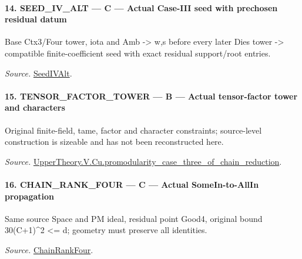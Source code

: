 \documentclass[11pt,a4paper]{article}
\numberwithin{equation}{section}
\theoremstyle{remark}\newtheorem{remark}[theorem]{Remark}
\begin{document}
\paragraph{14. SEED\_\allowbreak IV\_\allowbreak ALT — C — Actual Case-III seed with prechosen residual datum}

Base Ctx3/Four tower, iota and Amb -> w,s before every later Dies tower -> compatible finite-coefficient seed with exact residual support/root entries.

\emph{Source.} \href{https://github.com/CocoSgt/riemann-hypothesis-lean/blob/7cbf7a0c32fca1badf05931879a37c3f8a2b03b4/src/Development/AutomorphicArithmetic/AutomorphicVarieties/ModularityArgument/ThresholdArguments/DenseThresholdCases/PromodularityCaseThree.lean#L19-L25}{SeedIVAlt}.



\paragraph{15. TENSOR\_\allowbreak FACTOR\_\allowbreak TOWER — B — Actual tensor-factor tower and characters}

Original finite-field, tame, factor and character constraints; source-level construction is sizeable and has not been reconstructed here.

\emph{Source.} \href{https://github.com/CocoSgt/riemann-hypothesis-lean/blob/7cbf7a0c32fca1badf05931879a37c3f8a2b03b4/src/Development/AutomorphicArithmetic/AutomorphicVarieties/ModularityArgument/ThresholdArguments/DenseThresholdCases/PromodularityCaseThreeOfLemmas.lean#L131-L153}{UpperTheory.V.Cu.promodularity\_\allowbreak case\_\allowbreak three\_\allowbreak of\_\allowbreak chain\_\allowbreak reduction}.



\paragraph{16. CHAIN\_\allowbreak RANK\_\allowbreak FOUR — C — Actual SomeIn-to-AllIn propagation}

Same source Space and PM ideal, residual point Good4, original bound 30(C+1)\textasciicircum{}2 <= d; geometry must preserve all identities.

\emph{Source.} \href{https://github.com/CocoSgt/riemann-hypothesis-lean/blob/7cbf7a0c32fca1badf05931879a37c3f8a2b03b4/src/Development/AutomorphicArithmetic/AutomorphicVarieties/ModularityArgument/ThresholdArguments/DenseThresholdCases/PromodularityCaseThree.lean#L26-L32}{ChainRankFour}.
\end{document}
